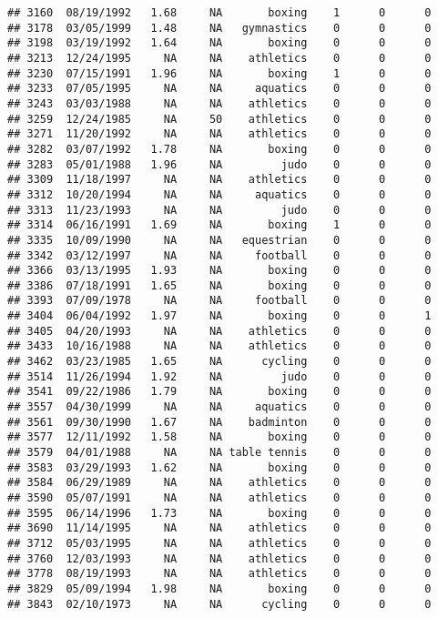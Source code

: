 \documentclass[]{article}
\begin{document}
\begin{verbatim}
## 3160  08/19/1992   1.68     NA       boxing    1      0      0
## 3178  03/05/1999   1.48     NA   gymnastics    0      0      0
## 3198  03/19/1992   1.64     NA       boxing    0      0      0
## 3213  12/24/1995     NA     NA    athletics    0      0      0
## 3230  07/15/1991   1.96     NA       boxing    1      0      0
## 3233  07/05/1995     NA     NA     aquatics    0      0      0
## 3243  03/03/1988     NA     NA    athletics    0      0      0
## 3259  12/24/1985     NA     50    athletics    0      0      0
## 3271  11/20/1992     NA     NA    athletics    0      0      0
## 3282  03/07/1992   1.78     NA       boxing    0      0      0
## 3283  05/01/1988   1.96     NA         judo    0      0      0
## 3309  11/18/1997     NA     NA    athletics    0      0      0
## 3312  10/20/1994     NA     NA     aquatics    0      0      0
## 3313  11/23/1993     NA     NA         judo    0      0      0
## 3314  06/16/1991   1.69     NA       boxing    1      0      0
## 3335  10/09/1990     NA     NA   equestrian    0      0      0
## 3342  03/12/1997     NA     NA     football    0      0      0
## 3366  03/13/1995   1.93     NA       boxing    0      0      0
## 3386  07/18/1991   1.65     NA       boxing    0      0      0
## 3393  07/09/1978     NA     NA     football    0      0      0
## 3404  06/04/1992   1.97     NA       boxing    0      0      1
## 3405  04/20/1993     NA     NA    athletics    0      0      0
## 3433  10/16/1988     NA     NA    athletics    0      0      0
## 3462  03/23/1985   1.65     NA      cycling    0      0      0
## 3514  11/26/1994   1.92     NA         judo    0      0      0
## 3541  09/22/1986   1.79     NA       boxing    0      0      0
## 3557  04/30/1999     NA     NA     aquatics    0      0      0
## 3561  09/30/1990   1.67     NA    badminton    0      0      0
## 3577  12/11/1992   1.58     NA       boxing    0      0      0
## 3579  04/01/1988     NA     NA table tennis    0      0      0
## 3583  03/29/1993   1.62     NA       boxing    0      0      0
## 3584  06/29/1989     NA     NA    athletics    0      0      0
## 3590  05/07/1991     NA     NA    athletics    0      0      0
## 3595  06/14/1996   1.73     NA       boxing    0      0      0
## 3690  11/14/1995     NA     NA    athletics    0      0      0
## 3712  05/03/1995     NA     NA    athletics    0      0      0
## 3760  12/03/1993     NA     NA    athletics    0      0      0
## 3778  08/19/1993     NA     NA    athletics    0      0      0
## 3829  05/09/1994   1.98     NA       boxing    0      0      0
## 3843  02/10/1973     NA     NA      cycling    0      0      0

\end{verbatim}
\end{document}
